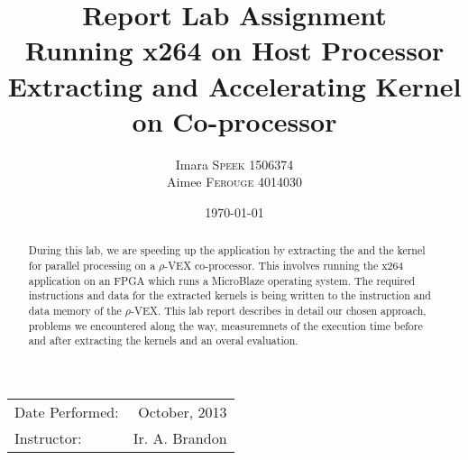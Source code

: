 \documentclass{article}
\title{Report Lab Assignment \\ Running x264 on Host Processor\\ Extracting and Accelerating Kernel on Co-processor} %
\author{Imara \textsc{Speek} 1506374\\ Aimee \textsc{Ferouge} 4014030} %
\date{\today} %
\begin{document}
\maketitle %

\begin{center}
\begin{tabular}{l r}
Date Performed: & October, 2013 \\ %
Instructor: & Ir. A. Brandon %
\end{tabular}
\end{center}

 \begin{abstract}
During this lab, we are speeding up the  application by extracting the  and the  kernel for parallel processing on a $\rho$-VEX co-processor. This involves running the x264 application on an FPGA which runs a MicroBlaze operating system. The required instructions and data for the extracted kernels is being written to the instruction and data memory of the $\rho$-VEX. This lab report describes in detail our chosen approach, problems we encountered along the way, measuremnets of the execution time before and after extracting the kernels and an overal evaluation.
 \end{abstract}



 






%

%
%
%
%
%
\end{document}
